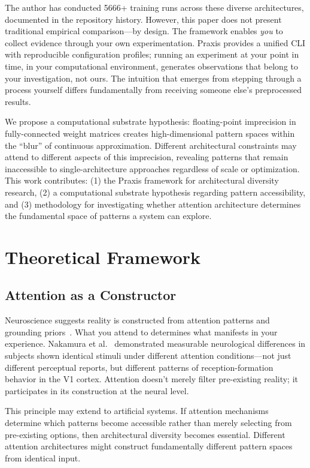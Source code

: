 \documentclass{article}
\begin{document}
The author has conducted 5666+ training runs across these diverse architectures, documented in the repository history. However, this paper does not present traditional empirical comparison—by design. The framework enables \textit{you} to collect evidence through your own experimentation. Praxis provides a unified CLI with reproducible configuration profiles; running an experiment at your point in time, in your computational environment, generates observations that belong to your investigation, not ours. The intuition that emerges from stepping through a process yourself differs fundamentally from receiving someone else's preprocessed results.

We propose a computational substrate hypothesis: floating-point imprecision in fully-connected weight matrices creates high-dimensional pattern spaces within the ``blur'' of continuous approximation. Different architectural constraints may attend to different aspects of this imprecision, revealing patterns that remain inaccessible to single-architecture approaches regardless of scale or optimization. This work contributes: (1) the Praxis framework for architectural diversity research, (2) a computational substrate hypothesis regarding pattern accessibility, and (3) methodology for investigating whether attention architecture determines the fundamental space of patterns a system can explore.

\section{Theoretical Framework}

\subsection{Attention as a Constructor}

Neuroscience suggests reality is constructed from attention patterns and grounding priors~\cite{friston2010free,clark2013whatever}. What you attend to determines what manifests in your experience. Nakamura et al.~\cite{nakamura2019observer} demonstrated measurable neurological differences in subjects shown identical stimuli under different attention conditions—not just different perceptual reports, but different patterns of reception-formation behavior in the V1 cortex. Attention doesn't merely filter pre-existing reality; it participates in its construction at the neural level.

This principle may extend to artificial systems. If attention mechanisms determine which patterns become accessible rather than merely selecting from pre-existing options, then architectural diversity becomes essential. Different attention architectures might construct fundamentally different pattern spaces from identical input.
\end{document}
